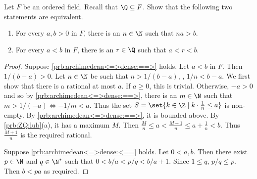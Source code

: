 \documentclass[12pt]{article}
\begin{document}
\begin{problem*} \label{prb:archimedean<=>dense}
    Let $F$ be an ordered field.
    Recall that $\Q \subseteq F$.
    Show that the following two statements are equivalent.
    \begin{enumerate}
        \item For every $a, b > 0$ in $F$,
            there is an $n \in \N$ such that $na > b$.
            \label{prb:archimedean<=>dense:==>}
        \item For every $a < b$ in $F$,
            there is an $r \in \Q$ such that $a < r < b$.
            \label{prb:archimedean<=>dense:<==}
    \end{enumerate}
\end{problem*}
\begin{proof}
    Suppose \cref{prb:archimedean<=>dense:==>} holds.
    Let $a < b$ in $F$.
    Then $1 / (b - a) > 0$.
    Let $n \in \N$ be such that $n > 1 / (b - a)$, \ie, $1/n < b - a$.
    We first show that there is a rational at most $a$.
    If $a \ge 0$, this is trivial.
    Otherwise, $-a > 0$ and so by \cref{prb:archimedean<=>dense:==>},
    there is an $m \in \N$ such that $m > 1 / (-a) \iff -1 / m < a$.
    Thus the set $S = \set{k \in \Z \mid k \cdot \frac1n \le a}$
    is non-empty.
    By \cref{prb:archimedean<=>dense:==>}, it is bounded above.
    By \cref{prb:ZQ:lub}(a), it has a maximum $M$.
    Then $\frac{M}{n} \le a < \frac{M + 1}{n} \le a + \frac1n < b$.
    Thus $\frac{M + 1}{n}$ is the required rational.

    Suppose \cref{prb:archimedean<=>dense:<==} holds.
    Let $0 < a, b$.
    Then there exist $p \in \N$ and $q \in \N^*$ such that
    $0 < b/a < p/q < b/a + 1$.
    Since $1 \le q$, $p/q \le p$.
    Then $b < pa$ as required.
\end{proof}
\end{document}
